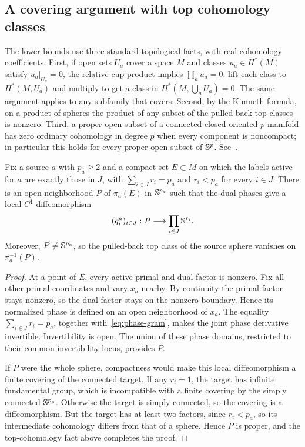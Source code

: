 \subsection{A covering argument with top cohomology classes}
The lower bounds use three standard topological facts, with real
cohomology coefficients. First, if open sets $U_a$ cover a
space $M$ and classes $u_a\in H^*(M)$ satisfy
$u_a|_{U_a}=0$, the relative cup product implies
$\prod_au_a=0$: lift each class to $H^*(M,U_a)$ and multiply to get a
class in $H^*(M,\bigcup_aU_a)=0$. The same argument applies to any
subfamily that covers. Second, by the K\"unneth formula, on a product of
spheres the product of any subset of the pulled-back top classes is
nonzero. Third, a proper open subset of a connected closed oriented $p$-manifold has
zero ordinary cohomology in degree $p$ when every component is
noncompact; in particular this holds for every proper open subset of
$\mathbb S^p$. See~\cite[Sections~3.2--3.3]{Hatcher2002}.

\begin{lemma}\label{lem:phase-domain}
Fix a source $a$ with $p_a\geq2$ and a compact set $E\subset M$ on which
the labels active for $a$ are exactly those in $J$, with $\sum_{i\in J}r_i=p_a$ and
$r_i<p_a$ for every $i\in J$. There is an open neighborhood $P$ of
$\pi_a(E)$ in $\mathbb S^{p_a}$ such that the dual phases give a local
$C^1$ diffeomorphism
\[
 (q_i^a)_{i\in J}:P\longrightarrow\prod_{i\in J}\mathbb S^{r_i}.
\]
Moreover, $P\ne\mathbb S^{p_a}$, so the pulled-back top class of the source
sphere vanishes on $\pi_a^{-1}(P)$.
\end{lemma}
\begin{proof}
At a point of $E$, every active primal and dual factor is nonzero.
Fix all other primal coordinates and vary $x_a$ nearby. By continuity the primal factor stays nonzero, so the dual factor stays
on the nonzero boundary. Hence its normalized phase is defined
on an open neighborhood of $x_a$. The equality $\sum_{i\in J}r_i=p_a$,
together with~\eqref{eq:phase-gram}, makes
the joint phase derivative invertible. Invertibility is open. The union
of these phase domains, restricted to their common invertibility locus,
provides $P$.

If $P$ were the whole sphere, compactness would make this local
diffeomorphism a finite covering of the connected target. If any
$r_i=1$, the target has infinite fundamental group, which is
incompatible with a finite covering by the simply connected $\mathbb S^{p_a}$.
Otherwise the target is simply connected, so the covering is a
diffeomorphism. But the target has at least two factors, since
$r_i<p_a$, so its intermediate cohomology differs from that of a sphere.
Hence $P$ is proper, and the top-cohomology fact above completes the
proof.
\end{proof}

